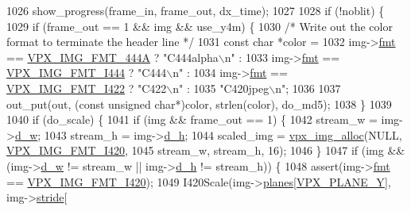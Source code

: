 \begin{DoxyCodeInclude}
{{{{{{{{{{{{{{{{{{{{{{{{{{{{{{{{{{{{{{{{1026       show\_progress(frame\_in, frame\_out, dx\_time);
1027 
1028     \textcolor{keywordflow}{if} (!noblit) \{
1029       \textcolor{keywordflow}{if} (frame\_out == 1 && img && use\_y4m) \{
1030         \textcolor{comment}{/* Write out the color format to terminate the header line */}
1031         \textcolor{keyword}{const} \textcolor{keywordtype}{char} *color =
1032             img->\hyperlink{structvpx__image_a1d734f8afa9200a21c2d9f6bcf8c04d8}{fmt} == \hyperlink{vpx__image_8h_a7a30a7bff7400fb83ad45fede5077193a945b48eb8ded59cfa6e544b5888da76c}{VPX\_IMG\_FMT\_444A} ? \textcolor{stringliteral}{"C444alpha\(\backslash\)n"} :
1033             img->\hyperlink{structvpx__image_a1d734f8afa9200a21c2d9f6bcf8c04d8}{fmt} == \hyperlink{vpx__image_8h_a7a30a7bff7400fb83ad45fede5077193aaeaaafc8f14c88e1a63ff9da398c9f99}{VPX\_IMG\_FMT\_I444} ? \textcolor{stringliteral}{"C444\(\backslash\)n"} :
1034             img->\hyperlink{structvpx__image_a1d734f8afa9200a21c2d9f6bcf8c04d8}{fmt} == \hyperlink{vpx__image_8h_a7a30a7bff7400fb83ad45fede5077193aff252f61fc80e0c71924beac4615e812}{VPX\_IMG\_FMT\_I422} ? \textcolor{stringliteral}{"C422\(\backslash\)n"} :
1035             \textcolor{stringliteral}{"C420jpeg\(\backslash\)n"};
1036 
1037         out\_put(out, (\textcolor{keyword}{const} \textcolor{keywordtype}{unsigned} \textcolor{keywordtype}{char}*)color, strlen(color), do\_md5);
1038       \}
1039 
1040       \textcolor{keywordflow}{if} (do\_scale) \{
1041         \textcolor{keywordflow}{if} (img && frame\_out == 1) \{
1042           stream\_w = img->\hyperlink{structvpx__image_a806bf23143bf00a0b3fdbd6ba030c483}{d\_w};
1043           stream\_h = img->\hyperlink{structvpx__image_a31bc5f045d4f3c2b6bb0f57bb53078e7}{d\_h};
1044           scaled\_img = \hyperlink{vpx__image_8h_ab80398f28ca880368a922fa979eb66c1}{vpx\_img\_alloc}(NULL, \hyperlink{vpx__image_8h_a7a30a7bff7400fb83ad45fede5077193af17ce49c9a6efd7c8c8ea8928d4ce26c}{VPX\_IMG\_FMT\_I420},
1045                                      stream\_w, stream\_h, 16);
1046         \}
1047         \textcolor{keywordflow}{if} (img && (img->\hyperlink{structvpx__image_a806bf23143bf00a0b3fdbd6ba030c483}{d\_w} != stream\_w || img->\hyperlink{structvpx__image_a31bc5f045d4f3c2b6bb0f57bb53078e7}{d\_h} != stream\_h)) \{
1048           assert(img->\hyperlink{structvpx__image_a1d734f8afa9200a21c2d9f6bcf8c04d8}{fmt} == \hyperlink{vpx__image_8h_a7a30a7bff7400fb83ad45fede5077193af17ce49c9a6efd7c8c8ea8928d4ce26c}{VPX\_IMG\_FMT\_I420});
1049           I420Scale(img->\hyperlink{structvpx__image_ab6258308ba7a5f4a113348120e20e2ce}{planes}[\hyperlink{vpx__image_8h_a08171c4636c655e1ab0b76e06219f9e2}{VPX\_PLANE\_Y}], img->\hyperlink{structvpx__image_ac9c7b83e3eea44cb680956f90dc789cf}{stride}[
}}}}}}}}}}}}}}}}}}}}}}}}}}}}}}}}}}}}}}}}
\end{DoxyCodeInclude}
